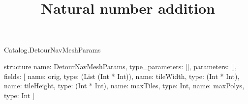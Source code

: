 \begin{lexlean}{Catalog.DetourNavMeshParams}
\title{Natural number addition}
\begin{semanticmodule}
structure{
  name: DetourNavMeshParams,
  type_parameters: [],
  parameters: [],
  fields: [
    {name: orig, type: (List (Int * Int))},
    {name: tileWidth, type: (Int * Int)},
    {name: tileHeight, type: (Int * Int)},
    {name: maxTiles, type: Int},
    {name: maxPolys, type: Int}
  ]
}
\end{semanticmodule}
\end{lexlean}
